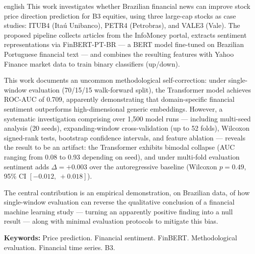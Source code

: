 \documentclass[
    12pt,
    openright,
    oneside,
    a4paper,
    english,
    brazil
]{abntex2}
\begin{document}
\begin{resumo}[Abstract]
\begin{otherlanguage*}{english}
This work investigates whether Brazilian financial news can improve stock price direction prediction for B3 equities, using three large-cap stocks as case studies: ITUB4 (Itaú Unibanco), PETR4 (Petrobras), and VALE3 (Vale). The proposed pipeline collects articles from the InfoMoney portal, extracts sentiment representations via FinBERT-PT-BR --- a BERT model fine-tuned on Brazilian Portuguese financial text --- and combines the resulting features with Yahoo Finance market data to train binary classifiers (up/down).

This work documents an uncommon methodological self-correction: under single-window evaluation (70/15/15 walk-forward split), the Transformer model achieves ROC-AUC of 0.709, apparently demonstrating that domain-specific financial sentiment outperforms high-dimensional generic embeddings. However, a systematic investigation comprising over 1,500 model runs --- including multi-seed analysis (20 seeds), expanding-window cross-validation (up to 52 folds), Wilcoxon signed-rank tests, bootstrap confidence intervals, and feature ablation --- reveals the result to be an artifact: the Transformer exhibits bimodal collapse (AUC ranging from 0.08 to 0.93 depending on seed), and under multi-fold evaluation sentiment adds $\Delta = +0.003$ over the autoregressive baseline (Wilcoxon $p = 0.49$, 95\% CI $[-0.012,\ +0.018]$).

The central contribution is an empirical demonstration, on Brazilian data, of how single-window evaluation can reverse the qualitative conclusion of a financial machine learning study --- turning an apparently positive finding into a null result --- along with minimal evaluation protocols to mitigate this bias.

\textbf{Keywords:} Price prediction. Financial sentiment. FinBERT. Methodological evaluation. Financial time series. B3.
\end{otherlanguage*}
\end{resumo}

\listoffigures*
\cleardoublepage

\listoftables*
\cleardoublepage
\end{document}
